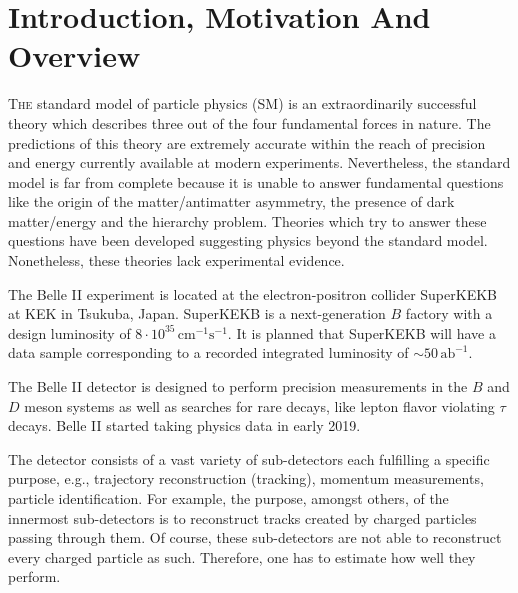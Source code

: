 \documentclass[a4paper,11pt,twosided,final,german,openbib,pdftex,listof=totoc,bibliography=totoc]{scrbook}
\begin{document}
\renewcommand\contentsname{Contents}
\renewcommand\figurename{Figure}
\renewcommand\tablename{Table}
\tableofcontents
\clearpage

\mainmatter
\sloppy





\chapter{Introduction, Motivation And Overview}
\label{sec:Introduction}


\lettrine{T}{he} standard model of particle physics (SM) is an extraordinarily successful theory which describes three out of the four fundamental forces in nature. The predictions of this theory are extremely accurate within the reach of precision and energy currently available at modern experiments. 
Nevertheless, the standard model is far from complete because it is unable to answer fundamental questions like the origin of the matter/antimatter asymmetry, the presence of dark matter/energy and the hierarchy problem. Theories which try to answer these questions have been developed suggesting physics beyond the standard model. Nonetheless, these theories lack experimental evidence.
\newline

The Belle II experiment is located at the electron-positron collider SuperKEKB at KEK in Tsukuba, Japan. SuperKEKB is a next-generation $B$ factory with a design luminosity of $8\cdot 10^{35}\,\textrm{cm}^{-1}\textrm{s}^{-1}$. It is planned that SuperKEKB will have a data sample corresponding to a recorded integrated luminosity of $\sim 50\,\textrm{ab}^{-1}$. 

The Belle II detector is designed to perform precision measurements in the $B$ and $D$ meson systems as well as searches for rare decays, like lepton flavor violating $\tau$ decays. 
Belle II started taking physics data in early 2019. 

The detector consists of a vast variety of sub-detectors each fulfilling a specific purpose, e.g., trajectory reconstruction (tracking), momentum measurements, particle identification. For example, the purpose, amongst others, of the innermost sub-detectors is to reconstruct tracks created by charged particles passing through them. Of course, these sub-detectors are not able to reconstruct every charged particle as such. Therefore, one has to estimate how well they perform.
\end{document}
